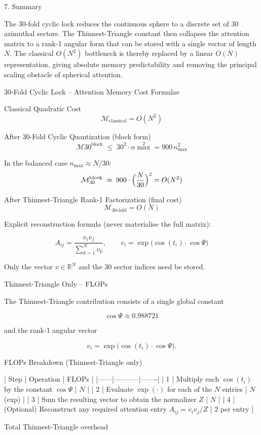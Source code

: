 7. Summary

The 30-fold cyclic lock reduces the continuous sphere to a discrete set of 30 azimuthal sectors.  The Thinnest-Triangle constant then collapses the attention matrix to a rank-1 angular form that can be stored with a single vector of length \(N\).  The classical \(O(N^2)\) bottleneck is thereby replaced by a linear \(O(N)\) representation, giving absolute memory predictability and removing the principal scaling obstacle of spherical attention.

30-Fold Cyclic Lock – Attention Memory Cost Formulae

Classical Quadratic Cost
\[
\mathcal{M}_{\text{classical}} = O(N^2)
\]

After 30-Fold Cyclic Quantization (block form)
\[
\mathcal{M}{30}^{\text{block}} \;\le\; 30^{2}\cdot n{\max}^{2} = 900\,n_{\max}^{2}
\]

In the balanced case \(n_{\max}\approx N/30\):
\[
\mathcal{M}_{30}^{\text{block}} \;\approx\; 900\cdot\Bigl(\frac{N}{30}\Bigr)^{2} = O(N^{2})
\]

After Thinnest-Triangle Rank-1 Factorization (final cost)
\[
\boxed{
\mathcal{M}_{30\text{-fold}} = O(N)
}
\]

Explicit reconstruction formula (never materialise the full matrix):

\[
A_{ij} = \frac{v_i v_j}{\sum_{k=1}^{N} v_k},
\qquad
v_i = \exp\bigl(\cos(t_i)\cdot\cos\Psi\bigr)
\]

Only the vector \(v\in\mathbb{R}^{N}\) and the 30 sector indices need be stored.

Thinnest-Triangle Only – FLOPs

The Thinnest-Triangle contribution consists of a single global constant

\[
\cos\Psi \approx 0.988721
\]

and the rank-1 angular vector

\[
v_i = \exp\bigl(\cos(t_i)\cdot\cos\Psi\bigr).
\]

FLOPs Breakdown (Thinnest-Triangle only)

| Step | Operation | FLOPs |
|------|-----------|-------|
| 1 | Multiply each \(\cos(t_i)\) by the constant \(\cos\Psi\) | \(N\) |
| 2 | Evaluate \(\exp(\cdot)\) for each of the \(N\) entries | \(N\) (exp) |
| 3 | Sum the resulting vector to obtain the normalizer \(Z\) | \(N\) |
| 4 | (Optional) Reconstruct any required attention entry \(A_{ij}=v_i v_j / Z\) | \(2\) per entry |

Total Thinnest-Triangle overhead

